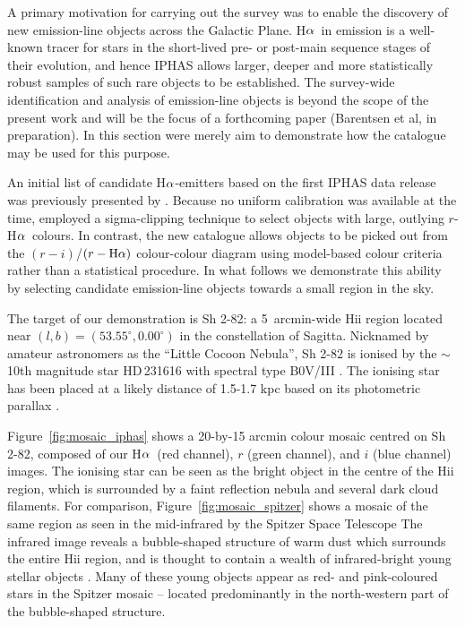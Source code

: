 \documentclass[useAMS,usenatbib]{mn2e}
\def\ha{\mbox{H$\rm \alpha$}}
\begin{document}
A primary motivation for carrying out the survey 
was to enable the discovery 
of new emission-line objects
across the Galactic Plane.
\ha\ in emission is a well-known tracer
for stars in the short-lived pre- or
post-main sequence stages of their evolution,
and hence IPHAS allows larger, deeper
and more statistically robust samples
of such rare objects to be established.
The survey-wide identification and analysis 
of emission-line objects is beyond the scope
of the present work and will be the focus
of a forthcoming paper (Barentsen et al, in preparation).
In this section were merely aim to demonstrate
how the catalogue may be used for this purpose.

An initial list of candidate \ha-emitters
based on the first IPHAS data release was previously
presented by \cite{Witham2008}. 
Because no uniform calibration was available
at the time, \citeauthor{Witham2008} employed 
a sigma-clipping technique to select objects with
large, outlying $r$-\ha\ colours.
In contrast, the new catalogue
allows objects to be picked out
from the $(r-i)$/$(r-\ha)$ colour-colour diagram
using model-based colour criteria
rather than a statistical procedure.
In what follows we demonstrate this ability 
by selecting candidate emission-line objects
towards a small region in the sky.

The target of our demonstration is Sh 2-82:
a 5~arcmin-wide H{\sc ii} region located near $(l,b)=(53.55^\circ, 0.00^\circ)$
in the constellation of Sagitta.
Nicknamed by amateur astronomers as the ``Little Cocoon Nebula'',
Sh 2-82 is ionised by 
the $\sim$10th magnitude star HD\,231616
with spectral type B0V/III
\citep{Georgelin1973,Mayer1973,Hunter1990}.
The ionising star has been placed 
at a likely distance of 1.5-1.7 kpc
based on its photometric parallax
\citep{Mayer1973,Lahulla1985,Hunter1990}.

Figure~\ref{fig:mosaic_iphas} shows a 20-by-15 arcmin
colour mosaic centred on Sh 2-82,
composed of our \ha\ (red channel),
$r$ (green channel),
and $i$ (blue channel) images.
The ionising star can be seen as the bright object
in the centre of the H{\sc ii} region,
which is surrounded by a faint reflection nebula
and several dark cloud filaments.
For comparison, Figure~\ref{fig:mosaic_spitzer} shows
a mosaic of the same region 
as seen in the mid-infrared by the Spitzer Space Telescope
The infrared image reveals a bubble-shaped structure
of warm dust which surrounds the entire H{\sc ii} region,
and is thought to contain a wealth of infrared-bright
young stellar objects \citep{Yu2012}.
Many of these young objects 
appear as red- and pink-coloured stars in the Spitzer mosaic --
located predominantly in the north-western part
of the bubble-shaped structure.
\end{document}
